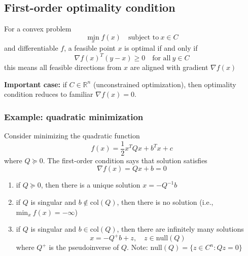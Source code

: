 \documentclass[a4paper]{article}
\begin{document}
{\subsection{First-order optimality condition}
\begin{defi}
  For a convex problem
  \[
    \min_x f(x) \quad \text{subject to} \ x \in C
  \]
  and differentiable $f$, a feasible point $x$ is optimal if and only if 
  \[
    \nabla f(x)^T (y-x)\geq 0  \quad \text{for all} \ y \in C
  \]
this means all feasible directions from $x$ are aligned with gradient $\nabla f(x)$
\end{defi}

\textbf{Important case:} if $C \in \mathbb{R}^n$ (unconstrained optimization), then optimality condition reduces to familiar $\nabla f(x) = 0$.

\subsubsection{Example: quadratic minimization}
Consider minimizing the quadratic function
\begin{equation}
  f(x) = \frac{1}{2}x^T Q x + b^T x + c \nonumber
\end{equation}
where $Q \succeq 0$. The first-order condition says that solution satisfies
\begin{equation}
  \nabla f(x) = Q x + b = 0 \nonumber
\end{equation}
\begin{enumerate}
  \item if $Q \succeq 0$, then there is a unique solution $x = -Q ^{-1}b$
  \item if $Q $ is singular and $b \notin \text{col}(Q)$, then there is no solution (i.e., $\text{min}_x \ f(x) = - \infty$)
  \item if $Q $ is singular and $b \in \text{col}(Q)$, then there are infinitely many solutions
  \begin{equation}
    x = -Q^+ b + z, \quad z \in \text{null}(Q) \nonumber
  \end{equation}
  where $Q^+$ is the pseudoinverse of $Q$. Note: $\text{null}(Q) = \{z \in C^n : Qz = 0 \} $
\end{enumerate}

}
\end{document}
